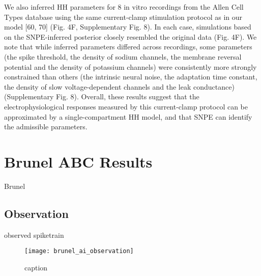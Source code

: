 We also inferred HH parameters for 8 in vitro recordings from the Allen Cell Types database using the same current-clamp stimulation protocol as in our model [60, 70] (Fig. 4F, Supplementary Fig. 8). In each case, simulations based on the SNPE-inferred posterior closely resembled the original data (Fig. 4F). We note that while inferred parameters differed across recordings, some parameters (the spike threshold, the density of sodium channels, the membrane reversal potential and the density of potassium channels) were consistently more strongly constrained than others (the intrinsic neural noise, the adaptation time constant, the density of slow voltage-dependent channels and the leak conductance) (Supplementary Fig. 8). Overall, these results suggest that the electrophysiological responses measured by this current-clamp protocol can be approximated by a single-compartment HH model, and that SNPE can identify the admissible parameters.





\chapter{Brunel ABC Results}

Brunel 

\section{Observation}

observed spiketrain 

\begin{figure}[H]
    \centering
    \texttt{[image: brunel\_ai\_observation]}
    \caption{caption}
    \label{fig:fig1}
\end{figure}

